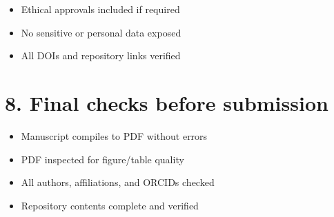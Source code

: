\documentclass[11pt]{article}
\begin{document}
\begin{Form}
\begin{itemize}[leftmargin=1.5cm]
    \item \CheckBox{} Ethical approvals included if required
    \item \CheckBox{} No sensitive or personal data exposed
    \item \CheckBox{} All DOIs and repository links verified
\end{itemize}

\section*{8. Final checks before submission}

\begin{itemize}[leftmargin=1.5cm]
    \item \CheckBox{} Manuscript compiles to PDF without errors
    \item \CheckBox{} PDF inspected for figure/table quality
    \item \CheckBox{} All authors, affiliations, and ORCIDs checked
    \item \CheckBox{} Repository contents complete and verified
\end{itemize}

\end{Form}
\end{document}

